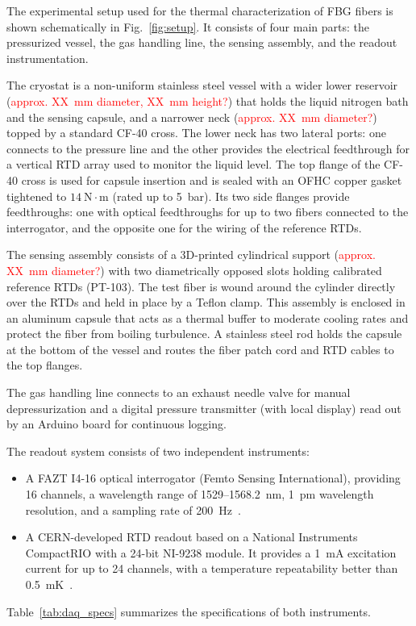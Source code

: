 \documentclass[preprint,11pt]{elsarticle}
\begin{document}
The experimental setup used for the thermal characterization of FBG fibers is shown schematically in Fig.~\ref{fig:setup}. It consists of four main parts: the pressurized vessel, the gas handling line, the sensing assembly, and the readout instrumentation.

The cryostat is a non-uniform stainless steel vessel with a wider lower reservoir (\textcolor{red}{approx. XX~mm diameter, XX~mm height?}) that holds the liquid nitrogen bath and the sensing capsule, and a narrower neck (\textcolor{red}{approx. XX~mm diameter?}) topped by a standard CF-40 cross. The lower neck has two lateral ports: one connects to the pressure line and the other provides the electrical feedthrough for a vertical RTD array used to monitor the liquid level. The top flange of the CF-40 cross is used for capsule insertion and is sealed with an OFHC copper gasket tightened to $14~\text{N}\cdot\text{m}$ (rated up to 5~bar). Its two side flanges provide feedthroughs: one with optical feedthroughs for up to two fibers connected to the interrogator, and the opposite one for the wiring of the reference RTDs.

The sensing assembly consists of a 3D-printed cylindrical support (\textcolor{red}{approx. XX~mm diameter?}) with two diametrically opposed slots holding calibrated reference RTDs (PT-103). The test fiber is wound around the cylinder directly over the RTDs and held in place by a Teflon clamp. This assembly is enclosed in an aluminum capsule that acts as a thermal buffer to moderate cooling rates and protect the fiber from boiling turbulence. A stainless steel rod holds the capsule at the bottom of the vessel and routes the fiber patch cord and RTD cables to the top flanges.

The gas handling line connects to an exhaust needle valve for manual depressurization and a digital pressure transmitter (with local display) read out by an Arduino board for continuous logging.

The readout system consists of two independent instruments:
\begin{itemize}
    \item A FAZT I4-16 optical interrogator (Femto Sensing International), providing 16 channels, a wavelength range of 1529--1568.2~nm, 1~pm wavelength resolution, and a sampling rate of 200~Hz~\cite{FemtoSenseManual}.
    \item A CERN-developed RTD readout based on a National Instruments CompactRIO with a 24-bit NI-9238 module. It provides a 1~mA excitation current for up to 24 channels, with a temperature repeatability better than 0.5~mK~\cite{RTDs_paper}.
\end{itemize}
Table~\ref{tab:daq_specs} summarizes the specifications of both instruments.
\end{document}
